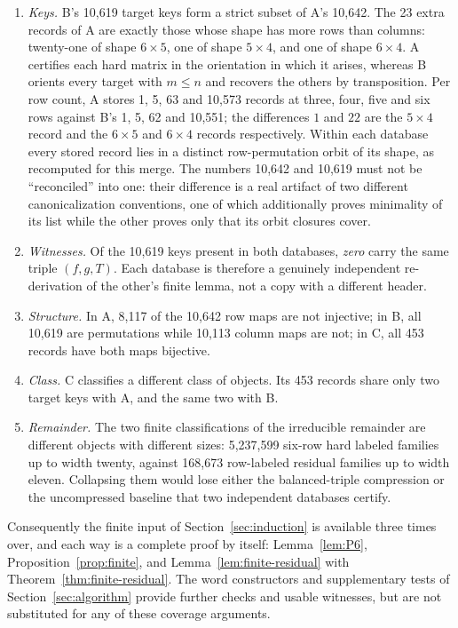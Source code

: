 \documentclass[11pt,letterpaper]{article}
\numberwithin{equation}{section}
\theoremstyle{definition}
\theoremstyle{remark}
\newcommand{\dbA}{\textsf{A}}
\newcommand{\dbB}{\textsf{B}}
\newcommand{\dbC}{\textsf{C}}
\begin{document}
\begin{enumerate}[label=(\alph*)]
\item \emph{Keys.} \dbB{}'s 10,619 target keys form a strict subset of
\dbA{}'s 10,642. The 23 extra records of \dbA{} are exactly those whose shape
has more rows than columns: twenty-one of shape $6\times5$, one of shape
$5\times4$, and one of shape $6\times4$. \dbA{} certifies each hard matrix in
the orientation in which it arises, whereas \dbB{} orients every target with
$m\le n$ and recovers the others by transposition. Per row count, \dbA{}
stores 1, 5, 63 and 10,573 records at three, four, five and six rows against
\dbB{}'s 1, 5, 62 and 10,551; the differences $1$ and $22$ are the $5\times4$
record and the $6\times5$ and $6\times4$ records respectively. Within each
database every stored record lies in a distinct row-permutation orbit of its
shape, as recomputed for this merge. The numbers 10,642 and 10,619 must not be
``reconciled'' into one: their difference is a real artifact of two different
canonicalization conventions, one of which additionally proves minimality of
its list while the other proves only that its orbit closures cover.
\item \emph{Witnesses.} Of the 10,619 keys present in both databases,
\emph{zero} carry the same triple $(f,g,T)$. Each database is therefore a
genuinely independent re-derivation of the other's finite lemma, not a copy
with a different header.
\item \emph{Structure.} In \dbA{}, 8,117 of the 10,642 row maps are not
injective; in \dbB{}, all 10,619 are permutations while 10,113 column maps are
not; in \dbC{}, all 453 records have both maps bijective.
\item \emph{Class.} \dbC{} classifies a different class of objects. Its
453 records share only two target keys with \dbA{}, and the same two with
\dbB{}.
\item \emph{Remainder.} The two finite classifications of the irreducible
remainder are different objects with different sizes: 5,237,599 six-row hard
labeled families up to width twenty, against 168,673 row-labeled residual
families up to width eleven. Collapsing them would lose either the
balanced-triple compression or the uncompressed baseline that two independent
databases certify.
\end{enumerate}

Consequently the finite input of Section~\ref{sec:induction} is available
three times over, and each way is a complete proof by itself:
Lemma~\ref{lem:P6}, Proposition~\ref{prop:finite}, and
Lemma~\ref{lem:finite-residual} with Theorem~\ref{thm:finite-residual}.
The word constructors and supplementary tests of
Section~\ref{sec:algorithm} provide further checks and usable witnesses, but
are not substituted for any of these coverage arguments.
\end{document}
